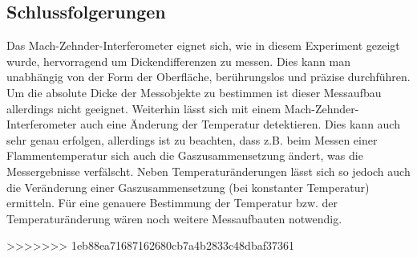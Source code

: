 \subsection*{Schlussfolgerungen}
Das Mach-Zehnder-Interferometer eignet sich, wie in diesem Experiment gezeigt wurde, hervorragend um Dickendifferenzen zu messen. Dies kann man unabhängig von der Form der Oberfläche, berührungslos und präzise durchführen. Um die absolute Dicke der Messobjekte zu bestimmen ist dieser Messaufbau allerdings nicht geeignet.
Weiterhin lässt sich mit einem Mach-Zehnder-Interferometer auch eine Änderung der Temperatur detektieren. Dies kann auch sehr genau erfolgen, allerdings ist zu beachten, dass z.B. beim Messen einer Flammentemperatur sich auch die Gaszusammensetzung ändert, was die Messergebnisse verfälscht. 
Neben Temperaturänderungen lässt sich so jedoch auch die Veränderung einer Gaszusammensetzung (bei konstanter Temperatur) ermitteln. Für eine genauere Bestimmung der Temperatur bzw. der Temperaturänderung wären noch weitere Messaufbauten notwendig.  

>>>>>>> 1eb88ea71687162680cb7a4b2833c48dbaf37361

